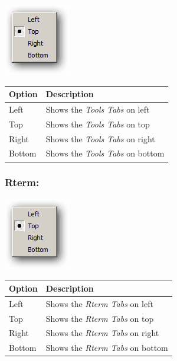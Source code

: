 \includegraphics[scale=0.50]{./res/menu_view_tabs_tools.png}\\

\begin{scriptsize}\begin{tabularx}{\textwidth}{>{\hsize=0.3\hsize}X>{\hsize=0.7\hsize}X}\\
    \hline
    \textbf{Option} & \textbf{Description} \\
    \hline
    Left & Shows the \textit{Tools Tabs} on left \\
    Top & Shows the \textit{Tools Tabs} on top \\
    Right & Shows the \textit{Tools Tabs} on right \\
    Bottom & Shows the \textit{Tools Tabs} on bottom \\
    \hline
  \end{tabularx}\end{scriptsize}


\hypertarget{menu_view_tabs_rterm}{}
\subsubsection{Rterm:}

\includegraphics[scale=0.50]{./res/menu_view_tabs_rterm.png}\\

\begin{scriptsize}\begin{tabularx}{\textwidth}{>{\hsize=0.3\hsize}X>{\hsize=0.7\hsize}X}\\
    \hline
    \textbf{Option} & \textbf{Description} \\
    \hline
    Left & Shows the \textit{Rterm Tabs} on left \\
    Top & Shows the \textit{Rterm Tabs} on top \\
    Right & Shows the \textit{Rterm Tabs} on right \\
    Bottom & Shows the \textit{Rterm Tabs} on bottom \\
    \hline
  \end{tabularx}\end{scriptsize}



